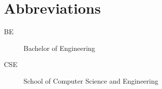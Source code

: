 \chapter*{Abbreviations}\label{abbr}
\begin{description}
\item[BE] Bachelor of Engineering
\item[CSE] School of Computer Science and Engineering 
\end{description}